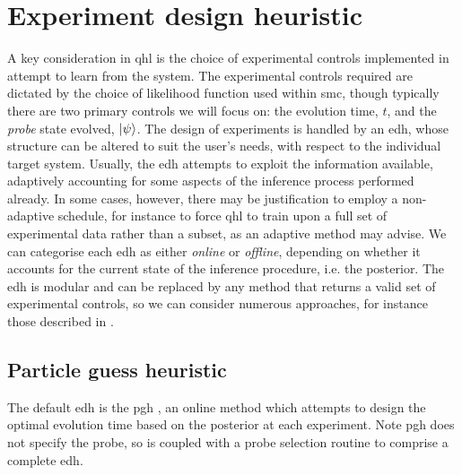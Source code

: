 \section{Experiment design heuristic}\label{sec:heuristic}
A key consideration in \gls{qhl} is the choice of experimental controls implemented in attempt to learn from the system. 
The experimental controls required are dictated by the choice of  \gls{likelihood} function used within \gls{smc}, 
though typically there are two primary controls we will focus on: 
the evolution time, $t$, and the \emph{\gls{probe}} state evolved, $\ket{\psi}$. 
The design of \glspl{experiment} is handled by an \gls{edh}, 
whose structure can be altered to suit the user's needs, with respect to the individual target system. 
Usually, the \gls{edh} attempts to exploit the information available, 
adaptively accounting for some aspects of the inference process performed already. 
In some cases, however, there may be justification to employ a non-adaptive schedule, 
for instance to force \gls{qhl} to train upon a full set of experimental data rather than a subset,
as an adaptive method may advise.
We can categorise each \gls{edh} as either \emph{online} or \emph{offline},
depending on whether it accounts for the current state of the inference procedure, i.e. the posterior.
The \gls{edh} is modular and can be replaced by any method that returns a valid set of experimental controls, 
so we can consider numerous approaches, for instance those described in \cite{hincks2018hamiltonian, fiderer2020neural}.
\par 

\subsection{Particle guess heuristic}\label{sec:pgh}
The default \gls{edh} is the \gls{pgh} \cite{Wiebe:2014qhl}, 
an online method which attempts to design the optimal evolution time based on the posterior at each experiment.
Note \gls{pgh} does not specify the \gls{probe}, so is coupled with a \gls{probe} selection routine to comprise 
a complete \gls{edh}.
\par

